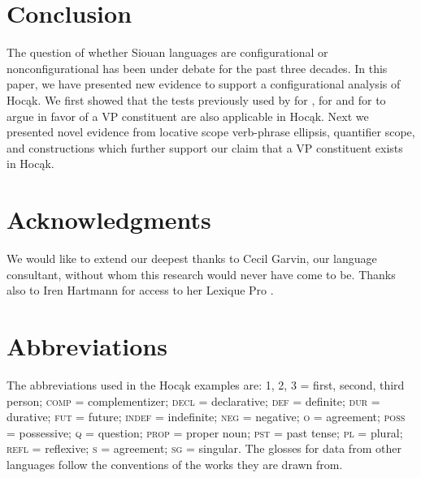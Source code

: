 \documentclass[output=paper]{LSP/langsci}
\begin{document}
\section{Conclusion}\label{sec:jrs:5}

The question of whether Siouan languages are configurational or nonconfigurational has been under debate for the past three decades. In this paper, we have presented new evidence to support a configurational analysis of Hocąk.  We first showed that the tests previously used by \citet{Boyle2007} for , \citet{Graczyk1991a} for  and \citet{West2003} for  to argue in favor of a VP constituent are also applicable in Hocąk.  Next we presented novel evidence from locative scope verb-phrase ellipsis, quantifier scope, and  constructions which further support our claim that a VP constituent exists in Hocąk. 

\section*{Acknowledgments}
We would like to extend our deepest thanks to Cecil Garvin, our language consultant, without whom this research would never have come to be. Thanks also to Iren Hartmann for access to her Lexique Pro .

\section*{Abbreviations}
The abbreviations used in the Hocąk examples are: 1, 2, 3 = first, second, third person; \textsc{comp} = complementizer; \textsc{decl} = declarative; \textsc{def} = definite; \textsc{dur} = durative; \textsc{fut} = future; \textsc{indef} = indefinite; \textsc{neg} = negative; \textsc{o} =  agreement; \textsc{poss} = possessive; \textsc{q} = question; \textsc{prop} = proper noun; \textsc{pst} = past tense; \textsc{pl} = plural; \textsc{refl} = reflexive; \textsc{s} =  agreement; \textsc{sg} = singular. The glosses for data from other languages follow the conventions of the works they are drawn from.
 
 

\printbibliography[heading=subbibliography,notkeyword=this]
\end{document}
